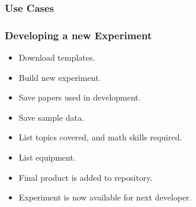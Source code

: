 \documentclass{beamer} %
\begin{document}
\begin{frame}
\frametitle{Use Cases}
\href{https://pjl.ucalgary.ca}{}
\end{frame}

\begin{frame}
\frametitle{Developing a new Experiment}
    \begin{itemize}
    		\item Download templates.
    		\item Build new experiment.
    		\item Save papers used in development.
    		\item Save sample data.
    		\item List topics covered, and math skills required.
    		\item List equipment.
    		\item Final product is added to repository.
    		\item Experiment is now available for next developer.
    \end{itemize}
\end{frame}
\end{document}
